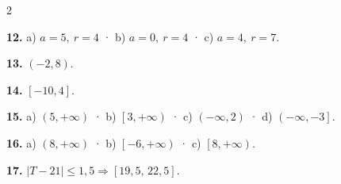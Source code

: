 \documentclass[13pt,a4paper]{extarticle}
\begin{document}
\begin{multicols}{2}
\begin{minipage}{\linewidth}
\end{minipage}\par\vspace{1.6mm}
\par\noindent\begin{minipage}{\linewidth}
\textbf{12.} a) $a=5,\ r=4$ · b) $a=0,\ r=4$ · c) $a=4,\ r=7$.\par
\end{minipage}\par\vspace{1.6mm}
\par\noindent\begin{minipage}{\linewidth}
\textbf{13.} $\left(-2,8\right)$.\par
\end{minipage}\par\vspace{1.6mm}
\par\noindent\begin{minipage}{\linewidth}
\textbf{14.} $\left[-10,4\right]$.\par
\end{minipage}\par\vspace{1.6mm}
\par\noindent\begin{minipage}{\linewidth}
\textbf{15.} a) $\left(5,+\infty\right)$ · b) $\left[3,+\infty\right)$ · c) $\left(-\infty,2\right)$ · d) $\left(-\infty,-3\right]$.\par
\end{minipage}\par\vspace{1.6mm}
\par\noindent\begin{minipage}{\linewidth}
\textbf{16.} a) $\left(8,+\infty\right)$ · b) $\left[-6,+\infty\right)$ · c) $\left[8,+\infty\right)$.\par
\end{minipage}\par\vspace{1.6mm}
\par\noindent\begin{minipage}{\linewidth}
\textbf{17.} $|T-21|\le1{,}5 \Rightarrow \left[19{,}5,\,22{,}5\right]$.\par
\end{minipage}\par\vspace{1.6mm}
\par\noindent\begin{minipage}{\linewidth}

\end{minipage}
\end{multicols}
\end{document}
